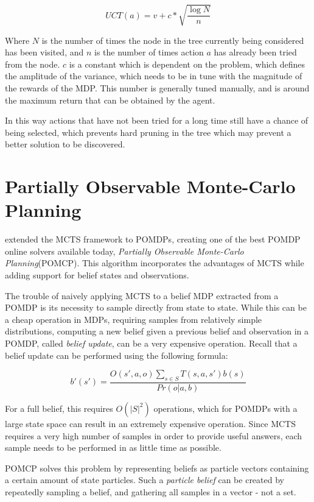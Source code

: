 \[ UCT(a) = v + c*\sqrt{\frac{\log{N}}{n}} \]

Where $N$ is the number of times the node in the tree currently being considered has been visited,
and $n$ is the number of times action $a$ has already been tried from the node. $c$ is a constant
which is dependent on the problem, which defines the amplitude of the variance, which needs to be in
tune with the magnitude of the rewards of the MDP. This number is generally tuned manually, and is
around the maximum return that can be obtained by the agent.

In this way actions that have not been tried for a long time still have a chance of being selected,
which prevents hard pruning in the tree which may prevent a better solution to be discovered.

\section{Partially Observable Monte-Carlo Planning}

\cite{cit:pomcp} extended the MCTS framework to POMDPs, creating one of the best POMDP online
solvers available today, \textit{Partially Observable Monte-Carlo Planning}(POMCP). This algorithm
incorporates the advantages of MCTS while adding support for belief states and observations.

The trouble of naively applying MCTS to a belief MDP extracted from a POMDP is its necessity to
sample directly from state to state. While this can be a cheap operation in MDPs, requiring 
samples from relatively simple distributions, computing a new belief given a previous belief and
observation in a POMDP, called \textit{belief update}, can be a very expensive operation. Recall that a belief
update can be performed using the following formula:

\[ b'(s') = \frac{O(s', a, o)\sum_{s\in S}T(s,a,s')b(s)}{Pr(o|a,b)} \]

For a full belief, this requires $O(|S|^2)$ operations, which for POMDPs with a large state space
can result in an extremely expensive operation. Since MCTS requires a very high number of samples in
order to provide useful answers, each sample needs to be performed in as little time as possible.

POMCP solves this problem by representing beliefs as particle vectors containing a certain amount of
state particles. Such a \textit{particle belief} can be created by repeatedly sampling a belief, and
gathering all samples in a vector - not a set.

